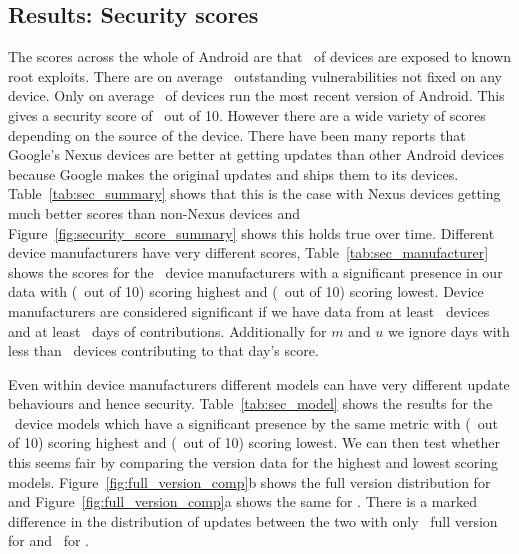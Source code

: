 \subsection{Results: Security scores}\label{sec:security_scoring:results}
The scores across the whole of Android are that \daMeanInsecurityPerc\ of devices are exposed to known root exploits.
There are on average \daMeanOutstandingVulnerabilities\ outstanding vulnerabilities not fixed on any device.
Only on average \daUpdatednessPerc\ of devices run the most recent version of Android.
This gives a security score of \daSecurityScore\ out of 10.
\daTabSecScoressummary
However there are a wide variety of scores depending on the source of the device.
There have been many reports that Google's Nexus devices are better at getting updates than other Android devices because Google makes the original updates and ships them to its devices.
Table~\ref{tab:sec_summary} shows that this is the case with Nexus devices getting much better scores than non-Nexus devices and Figure~\ref{fig:security_score_summary} shows this holds true over time.
\daTabSecScoresmanufacturer
Different device manufacturers have very different scores, Table~\ref{tab:sec_manufacturer} shows the scores for the \daNumSigManufacturers\ device manufacturers with a significant presence in our data with \emph{\daSecScoreBestmanufacturer} (\daSecScoreBestmanufacturerScore\ out of 10) scoring highest and \emph{\daSecScoreWorstmanufacturer} (\daSecScoreWorstmanufacturerScore\ out of 10) scoring lowest.
Device manufacturers are considered significant if we have data from at least \daSigNumDevices\ devices and at least \daSigNumDeviceDays\ days of contributions.
Additionally for $m$ and $u$ we ignore days with less than \daSigNumDevicesDay\ devices contributing to that day's score.

\daTabSecScoresmodel
Even within device manufacturers different models can have very different update behaviours and hence security.
Table~\ref{tab:sec_model} shows the results for the \daNumSigModels\ device models which have a significant presence by the same metric with \emph{\daSecScoreBestmodel} (\daSecScoreBestmodelScore\ out of 10) scoring highest and \emph{\daSecScoreWorstmodel} (\daSecScoreWorstmodelScore\ out of 10) scoring lowest.
We can then test whether this seems fair by comparing the version data for the highest and lowest scoring models.
Figure~\ref{fig:full_version_comp}b shows the full version distribution for \emph{\daSecScoreWorstmodel} and Figure~\ref{fig:full_version_comp}a shows the same for \emph{\daSecScoreBestmodel}.
There is a marked difference in the distribution of updates between the two with only \daSecScoreWorstmodelNumFullVersions\ full version for \emph{\daSecScoreWorstmodel} and \daSecScoreBestmodelNumFullVersions\ for \emph{\daSecScoreBestmodel}.

